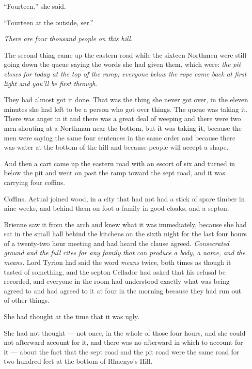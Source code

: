 “Fourteen,” she said.

“Fourteen at the outside, ser.”

\textit{There are four thousand people on this hill.}

\sceneBreak

The second thing came up the eastern road while the sixteen Northmen were still going down the queue saying the words she had given them, which were: \textit{the pit closes for today at the top of the ramp; everyone below the rope come back at first light and you’ll be first through.}

They had almost got it done. That was the thing she never got over, in the eleven minutes she had left to be a person who got over things. The queue was taking it. There was anger in it and there was a great deal of weeping and there were two men shouting at a Northman near the bottom, but it was taking it, because the men were saying the same four sentences in the same order and because there was water at the bottom of the hill and because people will accept a shape.

And then a cart came up the eastern road with an escort of six and turned in below the pit and went on past the ramp toward the sept road, and it was carrying four coffins.

Coffins. Actual joined wood, in a city that had not had a stick of spare timber in nine weeks, and behind them on foot a family in good cloaks, and a septon.

Brienne saw it from the arch and knew what it was immediately, because she had sat in the small hall behind the kitchens on the sixth night for the last four hours of a twenty-two hour meeting and had heard the clause agreed. \textit{Consecrated ground and the full rites for any family that can produce a body, a name, and the means.} Lord Tyrion had said the word \textit{means} twice, both times as though it tasted of something, and the septon Cellador had asked that his refusal be recorded, and everyone in the room had understood exactly what was being agreed to and had agreed to it at four in the morning because they had run out of other things.

She had thought at the time that it was ugly.

She had not thought — not once, in the whole of those four hours, and she could not afterward account for it, and there was no afterward in which to account for it — about the fact that the sept road and the pit road were the same road for two hundred feet at the bottom of Rhaenys’s Hill.

